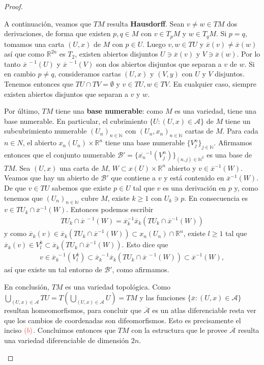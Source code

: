 \documentclass[11pt]{article}
\newcommand{\N}{\mathbb{N}}
\newcommand{\R}{\mathbb{R}}
\newcommand{\paint}[2]{\color{#1}{#2}}
\newcommand{\ol}{\overline}
\begin{document}
\begin{proof}
\begin{itemize}
A continuaci\'on, veamos que $TM$ resulta \textbf{Hausdorff}. Sean $v \neq w \in TM$ dos derivaciones, de forma que existen $p,q \in M$ con $v \in T_pM$ y $w \in T_qM$. Si $p = q$, tomamos una carta $(U,x)$ de $M$ con $p \in U$. Luego $v,w \in TU$ y $\ol{x}(v) \neq \ol{x}(w)$ as\'i que como $\R^{2n}$ es $T_2$, existen abiertos disjuntos $U \ni \ol{x}(v)$ y $V \ni \ol{x}(w)$. Por lo tanto $\ol{x}^{ \ -1}(U)$ y $\ol{x}^{\ -1}(V)$ son dos abiertos disjuntos que separan a $v$ de $w$. Si en cambio $p \neq q$, consideramos cartas $(U,x)$ y $(V,y)$ con $U$ y $V$ disjuntos. Tenemos entonces que $TU \cap TV = \emptyset$ y $v \in TU,w \in TV$. En cualquier caso, siempre existen abiertos disjuntos que separan a $v$ y $w$.

Por \'ultimo, $TM$ tiene una \textbf{base numerable}: como $M$ es una variedad, tiene una base numerable. En particular, el cubrimiento $\{U : (U,x) \in \mathcal{A}\}$ de $M$ tiene un subcubrimiento numerable $(U_n)_{n \in \N}$ con ${(U_n,x_n)}_{n \in \N}$ cartas de $M$. Para cada $n \in N$, el abierto $x_n(U_n) \times \R^n$ tiene una base numerable $\{V^n_j\}_{j \in \N}$. Afirmamos entonces que el conjunto numerable $\mathcal{B}' = \{\ol{x_n}^{-1}(V^n_j)\}_{(n,j) \in \N^2}$ es una base de $TM$. Sea $(U,x)$ una carta de $M$, $W \subset x(U) \times \R^n$ abierto y $v \in \ol{x}^{-1}(W)$. Veamos que hay un abierto de $\mathcal{B}'$ que contiene a $v$ y est\'a contenido en $\ol{x}^{-1}(W)$. De que $v \in TU$ sabemos que existe $p \in U$ tal que $v$ es una derivaci\'on en $p$ y, como tenemos que $(U_n)_{n \in \N}$ cubre $M$, existe $k \geq 1$ con $U_k \ni p$. En consecuencia es $v \in TU_k \cap \ol{x}^{-1}(W)$. Entonces podemos escribir
\begin{align*}
TU_k \cap \ol{x}^{\ -1}(W) = \ol{x}^{-1}_k\ol{x}_k(TU_k \cap \ol{x}^{-1}(W))
\end{align*}
y como $\ol{x}_k(v) \in \ol{x}_k(TU_k \cap \ol{x}^{-1}(W)) \subset x_n(U_n) \cap \R^n$, existe $l \geq 1$ tal que $\ol{x}_k(v) \in V_l^k \subset \ol{x}_k(TU_k \cap \ol{x}^{-1}(W))$. Esto dice que
\begin{align*}
v \in \ol{x}_k^{\ -1}(V_l^k) \subset \ol{x}^{\ -1}_k\ol{x}_k(TU_k \cap \ol{x}^{\ -1}(W)) \subset \ol{x}^{-1}(W),
\end{align*}
as\'i que existe un tal entorno de $\mathcal{B}'$, como afirmamos.

En conclusi\'on, $TM$ es una variedad topol\'ogica. Como $\bigcup_{(U,x) \in \mathcal{A}}TU = T (\bigcup_{(U,x) \in \mathcal{A}}U) = TM$ y las funciones $\{\ol{x} : (U,x) \in \mathcal{A}\}$ resultan homeomorfismos, para concluir que $\ol{\mathcal{A}}$ es un atlas diferenciable resta ver que los cambios de coordenadas son difeomorfismos. Esto es precisamente el inciso $\paint{red}{(b)}$. Concluimos entonces que $TM$ con la estructura que le provee $\ol{\mathcal{A}}$ resulta una variedad diferenciable de dimensi\'on $2n$.


\end{itemize}
\end{proof}
\end{document}
